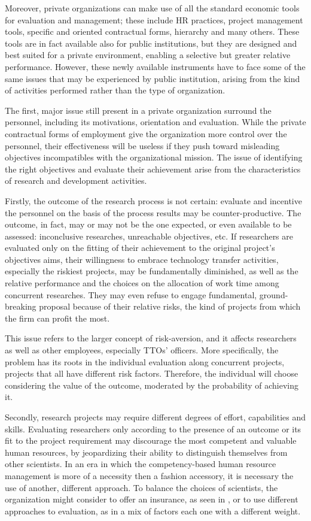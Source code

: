 Moreover, private organizations can make use of all the standard economic tools for evaluation and management; these include HR practices, project management tools, specific and oriented contractual forms, hierarchy and many others. These tools are in fact available also for public institutions, but they are designed and best suited for a private environment, enabling a selective but greater relative performance. However, these newly available instruments have to face some of the same issues that may be experienced by public institution, arising from the kind of activities performed rather than the type of organization.

The first, major issue still present in a private organization surround the personnel, including its motivations, orientation and evaluation. While the private contractual forms of employment give the organization more control over the personnel, their effectiveness will be useless if they push toward misleading objectives incompatibles with the organizational mission. The issue of identifying the right objectives and evaluate their achievement arise from the characteristics of research and development activities.

Firstly, the outcome of the research process is not certain: evaluate and incentive the personnel on the basis of the process results may be counter-productive. The outcome, in fact, may or may not be the one expected, or even available to be assessed: inconclusive researches, unreachable objectives, etc. If researchers are evaluated only on the fitting of their achievement to the original project's objectives aims, their willingness to embrace technology transfer activities, especially the riskiest projects, may be fundamentally diminished, as well as the relative performance and the choices on the allocation of work time among concurrent researches. They may even refuse to engage fundamental, ground-breaking proposal because of their relative risks, the kind of projects from which the firm can profit the most. 

This issue refers to the larger concept of risk-aversion, and it affects researchers as well as other employees, especially TTOs' officers. More specifically, the problem has its roots in the individual evaluation along concurrent projects, projects that all have different risk factors. Therefore, the individual will choose considering the value of the outcome, moderated by the probability of achieving it. 

Secondly, research projects may require different degrees of effort, capabilities and skills. Evaluating researchers only according to the presence of an outcome or its fit to the project requirement may discourage the most competent and valuable human resources, by jeopardizing their ability to distinguish themselves from other scientists. In an era in which the competency-based human resource management is more of a necessity then a fashion accessory, it is necessary the use of another, different approach. To balance the choices of scientists, the organization might consider to offer an insurance, as seen in \citet{Panagopoulos2013}, or to use different approaches to evaluation, as in a mix of factors each one with a different weight.

